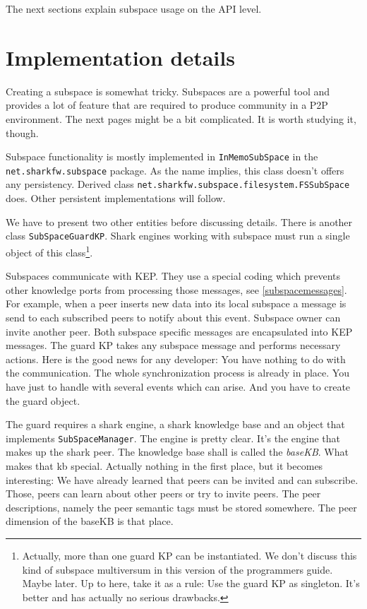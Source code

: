 The next sections explain subspace usage on the API level.

\section{Implementation details}
Creating a subspace is somewhat tricky. Subspaces are a powerful tool and
provides a lot of feature that are required to produce community in a P2P 
environment. The next pages might be a bit complicated. It is worth studying it, though.

Subspace functionality is mostly implemented in {\tt InMemoSubSpace} in the 
{\tt net.sharkfw.subspace} package. As the name implies, this class doesn't offers any persistency. Derived class {\tt net.sharkfw.subspace.filesystem.FSSubSpace} does. Other persistent implementations will follow.

We have to present two other entities before discussing details. 
There is another class {\tt SubSpaceGuardKP}. Shark engines working with subspace must run a single object of this class\footnote{Actually, more than
one guard KP can be instantiated. We don't discuss this kind of subspace multiversum in this version of the programmers guide. Maybe later. Up to here, take it as a rule: Use the guard KP as singleton. It's better and has actually no serious drawbacks.}.

Subspaces communicate with KEP. They use a special coding which prevents other knowledge ports from processing those messages, see \ref{subspacemessages}.
For example, when a peer inserts new data into its local subspace a message is
send to each subscribed peers to notify about this event. Subspace owner can
invite another peer. Both subspace specific messages are encapsulated into KEP messages. The guard KP takes any subspace message and performs necessary actions. Here is the good news for any developer: You have nothing to do with the communication. The whole synchronization process is already in place. You have just to handle with several events which can arise. And you have to create the guard object.

The guard requires a shark engine, a shark knowledge base and an object that implements {\tt SubSpaceManager}. The engine is pretty clear. It's the engine that makes up the shark peer. The knowledge base shall is called the {\it baseKB}. What makes that kb special. Actually nothing in the first place, but it becomes interesting: We have already learned that peers can be invited and can subscribe. Those, peers can learn about other peers or try to invite peers. The peer descriptions, namely the peer semantic tags must be stored somewhere. The peer dimension of the baseKB is that place. 

